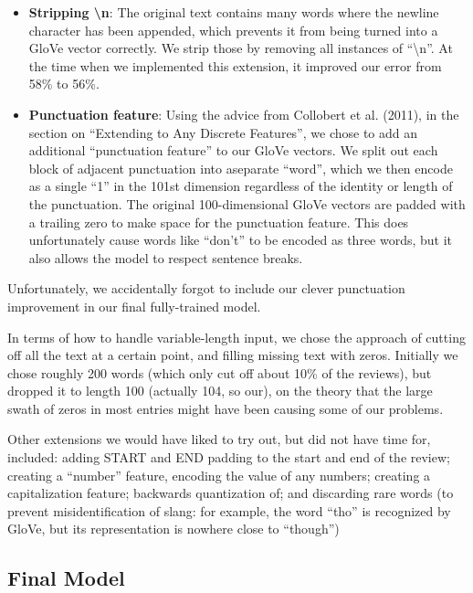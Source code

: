 \documentclass{article}
\begin{document}
\begin{itemize}
\item \textbf{Stripping \textbackslash n}: The original text contains many words where the newline character has been appended, which prevents it from being turned into a GloVe vector correctly. We strip those by removing all instances of ``\textbackslash n''. At the time when we implemented this extension, it improved our error from 58\% to 56\%.

\item \textbf{Punctuation feature}: Using the advice from Collobert et al. (2011), in the section on ``Extending to Any Discrete Features'', we chose to add an additional ``punctuation feature'' to our GloVe vectors. We split out each block of adjacent punctuation into aseparate ``word'', which we then encode as a single ``1'' in the 101st dimension regardless of the identity or length of the punctuation. The original 100-dimensional GloVe vectors are padded with a trailing zero to make space for the punctuation feature. This does unfortunately cause words like ``don't'' to be encoded as three words, but it also allows the model to respect sentence breaks. 
\end{itemize}

Unfortunately, we accidentally forgot to include our clever punctuation improvement in our final fully-trained model.

In terms of how to handle variable-length input, we chose the approach of cutting off all the text at a certain point, and filling missing text with zeros. Initially we chose roughly 200 words (which only cut off about 10\% of the reviews), but dropped it to length 100 (actually 104, so our), on the theory that the large swath of zeros in most entries might have been causing some of our problems.

Other extensions we would have liked to try out, but did not have time for, included: adding START and END padding to the start and end of the review; creating a ``number'' feature, encoding the value of any numbers; creating a capitalization feature; backwards quantization of; and discarding rare words (to prevent misidentification of slang: for example, the word ``tho'' is recognized by GloVe, but its representation is nowhere close to ``though'')

\subsection*{Final Model}
\label{finalmodel}
\end{document}

